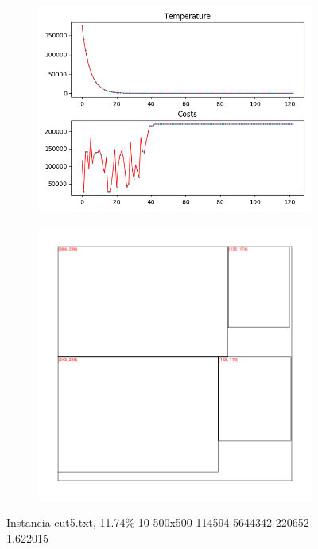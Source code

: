 \begin{figure}
\centering
\begin{subfigure}{.5\textwidth}
  \centering
  \includegraphics[width=1\linewidth]{results/cut5/2/plot}
  \label{fig:sub1}
\end{subfigure}%
\begin{subfigure}{.5\textwidth}
  \centering
  \includegraphics[width=1\linewidth]{results/cut5/2/cut}
  \label{fig:sub2}
\end{subfigure}
\caption{Instancia cut5.txt, 11.74\% 10 500x500 114594 5644342 220652 1.622015}
\label{fig:test}
\end{figure}


